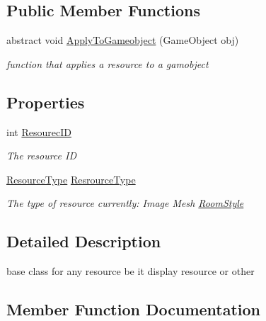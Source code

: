 \subsection*{Public Member Functions}
\begin{DoxyCompactItemize}
\item 
abstract void \mbox{\hyperlink{class_base_resource_a2d832c8042114da9e3f6240651d59703}{Apply\+To\+Gameobject}} (Game\+Object obj)
\begin{DoxyCompactList}\small\item\em function that applies a resource to a gamobject \end{DoxyCompactList}\end{DoxyCompactItemize}
\subsection*{Properties}
\begin{DoxyCompactItemize}
\item 
int \mbox{\hyperlink{class_base_resource_adbdcd8935067e622c993b912a475c21b}{Resourec\+ID}}
\begin{DoxyCompactList}\small\item\em The resource ID \end{DoxyCompactList}\item 
\mbox{\hyperlink{namespace_virt_muse_web_1_1_models_ab185d30c831a1ac813a53670c29d6397}{Resource\+Type}} \mbox{\hyperlink{class_base_resource_a6c40931e66a2e4fd8061f069eb0c0ba8}{Resrource\+Type}}
\begin{DoxyCompactList}\small\item\em The type of resource currently\+: Image Mesh \mbox{\hyperlink{class_room_style}{Room\+Style}} \end{DoxyCompactList}\end{DoxyCompactItemize}


\subsection{Detailed Description}
base class for any resource be it display resource or other 



\subsection{Member Function Documentation}
\mbox{\label{class_base_resource_a2d832c8042114da9e3f6240651d59703}} 
